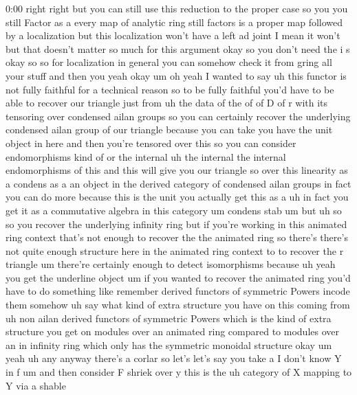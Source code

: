 \begin{unfinished}{0:00}
right
right  but  you  can  still  use  this
reduction  to  the  proper  case  so  you  you
still  Factor  as  a  every  map  of  analytic
ring  still  factors  is  a  proper  map
followed  by  a  localization  but  this
localization  won't  have  a  left  ad  joint
I  mean  it  won't  but  that  doesn't  matter
so  much  for  this  argument  okay  so  you
don't  need  the  i  s  okay  so  so  for
localization  in  general  you  can  somehow
check  it  from  gring  all  your  stuff  and
then  you
yeah  okay  um  oh  yeah  I  wanted  to
say  uh  this  functor  is  not  fully
faithful  for  a  technical  reason  so  to  be
fully  faithful  you'd  have  to  be  able  to
recover  our  triangle  just  from  uh  the
data  of  the  of  of  D  of  r  with  its
tensoring  over  condensed  ailan  groups  so
you  can  certainly  recover  the  underlying
condensed  ailan
group  of  our  triangle  because  you  can
take  you  have  the  unit  object  in  here
and  then  you're  tensored  over  this  so
you  can  consider  endomorphisms  kind  of
or  the  internal  uh  the  internal  the
internal  endomorphisms  of  this  and  this
will  give  you  our  triangle  so  over  this
linearity  as  a  condens  as  a  an  object  in
the  derived  category  of  condensed  ailan
groups  in  fact  you  can  do  more  because
this  is  the  unit  you  actually  get  this
as  a  uh  in  fact  you  get  it  as  a
commutative  algebra  in  this  category  um
condens  stab
um  but  uh  so  so  you  recover  the
underlying  infinity
ring  but  if  you're  working  in  this
animated  ring  context  that's  not  enough
to  recover  the  the  animated  ring  so
there's  there's  not  quite  enough
structure  here  in  the  animated  ring
context  to  to  recover  the  r
triangle  um  there're  certainly  enough  to
detect  isomorphisms  because  uh  yeah  you
get  the  underline
object  um  if  you  wanted  to  recover  the
animated  ring  you'd  have  to  do  something
like  remember  derived  functors  of
symmetric  Powers  incode  them  somehow  uh
say  what  kind  of  extra  structure  you
have  on  this  coming
from  uh  non  ailan  derived  functors  of
symmetric  Powers  which  is  the  kind  of
extra  structure  you  get  on  modules  over
an  animated  ring  compared  to  modules
over  an  in  infinity  ring  which  only  has
the  symmetric  monoidal
structure  okay  um  yeah  uh  any  anyway
there's  a  corlar  so
let's  let's  say  you  take  a  I  don't  know
Y  in
f  um  and  then
consider  F  shriek  over  y  this  is
the  uh
category  of  X  mapping  to  Y  via  a  shable

\end{unfinished}
